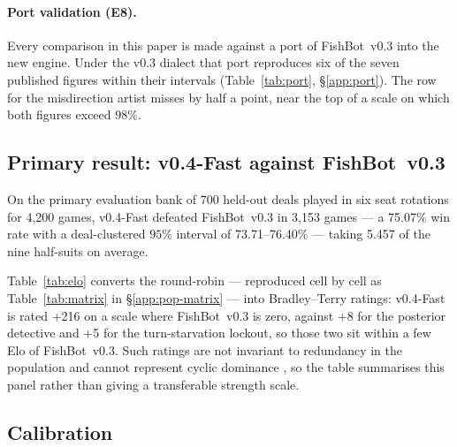 \documentclass[11pt]{article}
\theoremstyle{definition}
\DeclareRobustCommand{\vfast}{\texorpdfstring{\mbox{v0.4-Fast}}{v0.4-Fast}}
\DeclareRobustCommand{\vthree}{\texorpdfstring{\mbox{FishBot v0.3}}{FishBot v0.3}}
\newcommand{\numHtHGames}{4{,}200}
\newcommand{\numHtHDeals}{700}
\newcommand{\numVsVthree}{75.07}
\newcommand{\numVsVthreeCI}{73.71--76.40}
\newcommand{\numVsVthreeWins}{3{,}153}
\newcommand{\numVsVthreeSets}{5.457}
\newcommand{\numElo}{+216}
\newcommand{\numEloLockout}{+5}
\newcommand{\numEloDetective}{+8}
\begin{document}
\paragraph{Port validation (E8).}
Every comparison in this paper is made against a port of \vthree{} into the new
engine. Under the v0.3 dialect that port reproduces six of the seven published
figures within their intervals (Table~\ref{tab:port}, \S\ref{app:port}). The row for the
misdirection artist misses by half a point, near the top of a scale on which both
figures exceed $98\%$.


\subsection{Primary result: \vfast{} against \vthree{}}
\label{sec:results-h2h}

On the primary evaluation bank of \numHtHDeals{} held-out deals played in six
seat rotations for \numHtHGames{} games, \vfast{} defeated \vthree{} in
\numVsVthreeWins{} games --- a \numVsVthree\% win rate with a deal-clustered
$95\%$ interval of \numVsVthreeCI\% --- taking \numVsVthreeSets{} of the nine
half-suits on average.


Table~\ref{tab:elo} converts the round-robin --- reproduced cell by cell as
Table~\ref{tab:matrix} in \S\ref{app:pop-matrix} --- into
Bradley--Terry ratings: \vfast{} is rated \numElo{} on a scale where \vthree{} is
zero, against \numEloDetective{} for the posterior detective and \numEloLockout{}
for the turn-starvation lockout, so those two sit within a few Elo of \vthree{}.
Such ratings are not invariant to redundancy in the population and cannot
represent cyclic dominance \cite{balduzzi-reeval}, so the table summarises this
panel rather than giving a transferable strength scale.

\subsection{Calibration}
\label{sec:results-calib}
\end{document}
